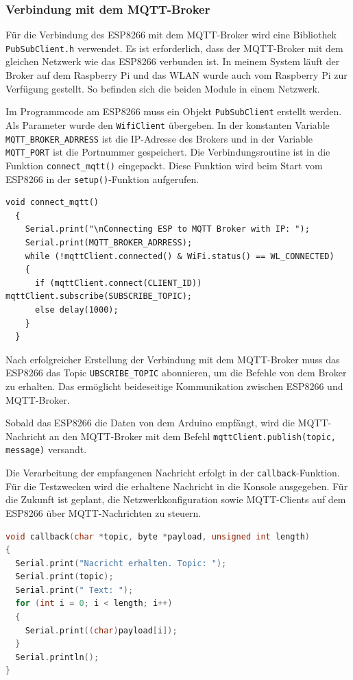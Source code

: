\documentclass[12pt, letterpaper]{article}
\begin{document}
\subsubsection{Verbindung mit dem MQTT-Broker}
\par Für die Verbindung des ESP8266 mit dem MQTT-Broker wird eine Bibliothek \texttt{PubSubClient.h} verwendet. Es ist erforderlich, dass der MQTT-Broker mit dem gleichen Netzwerk wie das ESP8266 verbunden ist. In meinem System läuft der Broker auf dem Raspberry Pi und das WLAN wurde auch vom Raspberry Pi zur Verfügung gestellt. So befinden sich die beiden Module in einem Netzwerk. 
\par Im Programmcode am ESP8266 muss ein Objekt \texttt{PubSubClient} erstellt werden. Als Parameter wurde den \texttt{WifiClient} übergeben. In der konstanten Variable \texttt{MQTT\_BROKER\_ADRRESS} ist die IP-Adresse des Brokers und in der Variable \texttt{MQTT\_PORT} ist die Portnummer gespeichert. Die Verbindungsroutine ist in die Funktion \texttt{connect\_mqtt()} eingepackt. Diese Funktion wird beim Start vom ESP8266 in der \texttt{setup()}-Funktion aufgerufen.
\begin{Verbatim}[frame=single]
  void connect_mqtt()
  {
    Serial.print("\nConnecting ESP to MQTT Broker with IP: ");
    Serial.print(MQTT_BROKER_ADRRESS);
    while (!mqttClient.connected() & WiFi.status() == WL_CONNECTED)
    {
      if (mqttClient.connect(CLIENT_ID)) mqttClient.subscribe(SUBSCRIBE_TOPIC);
      else delay(1000);
    }
  }
\end{Verbatim}
\par Nach erfolgreicher Erstellung der Verbindung mit dem MQTT-Broker muss das ESP8266 das Topic \texttt{UBSCRIBE\_TOPIC} abonnieren, um die Befehle von dem Broker zu erhalten. Das ermöglicht beideseitige Kommunikation zwischen ESP8266 und MQTT-Broker.
\par Sobald das ESP8266 die Daten von dem Arduino empfängt, wird die MQTT-Nachricht an den MQTT-Broker mit dem Befehl \texttt{mqttClient.publish(topic, message)} versandt.
\par Die Verarbeitung der empfangenen Nachricht erfolgt in der \texttt{callback}-Funktion. Für die Testzwecken wird die erhaltene Nachricht in die Konsole ausgegeben. Für die Zukunft ist geplant, die Netzwerkkonfiguration sowie MQTT-Clients auf dem ESP8266 über MQTT-Nachrichten zu steuern.

\begin{lstlisting}[frame=none, language=c, caption={caption text},captionpos=b]
  void callback(char *topic, byte *payload, unsigned int length)
{
  Serial.print("Nacricht erhalten. Topic: ");
  Serial.print(topic);
  Serial.print(" Text: ");
  for (int i = 0; i < length; i++)
  {
    Serial.print((char)payload[i]);
  }
  Serial.println();
}
\end{lstlisting}
\newpage
\end{document}

